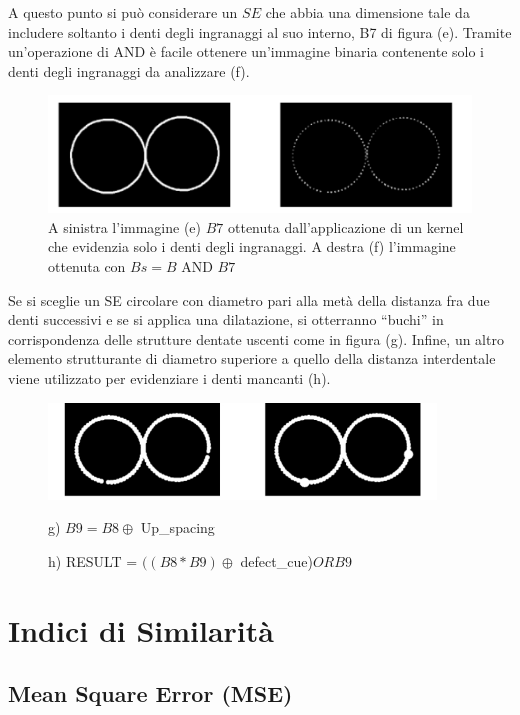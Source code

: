 A questo punto si può considerare un $SE$ che abbia una dimensione tale da includere soltanto i denti degli ingranaggi al suo interno,
B7 di figura (e). Tramite un'operazione di AND è facile ottenere un'immagine
binaria contenente solo i denti degli ingranaggi da analizzare (f).

\begin{figure}[H]
    \centering
    \includegraphics[width=\linewidth, keepaspectratio]{capitoli/immagini/imgs/orologi4.png}
    \caption{A sinistra l'immagine (e) $B7$ ottenuta dall'applicazione di un kernel che evidenzia solo i denti degli ingranaggi. A destra (f) l'immagine ottenuta con $Bs = B \text{ AND } B7$}
\end{figure}

Se si sceglie un SE circolare con diametro pari alla metà della distanza fra due denti successivi e se si applica una dilatazione, si
otterranno “buchi” in corrispondenza delle strutture dentate uscenti come in figura (g). Infine, un altro elemento strutturante di diametro superiore a
quello della distanza interdentale viene utilizzato per evidenziare i denti mancanti (h).

\begin{figure}[H]
    \centering
    \includegraphics[width=\linewidth, keepaspectratio]{capitoli/immagini/imgs/orologi5.png}
    \caption*{g) $B9=B8 \oplus$ Up\_spacing}
    \caption*{h) RESULT = $((B8 * B9) \oplus$ defect\_cue)$OR B9$ }
\end{figure}

\chapter{Indici di Similarità}

\section{Mean Square Error (MSE)}

